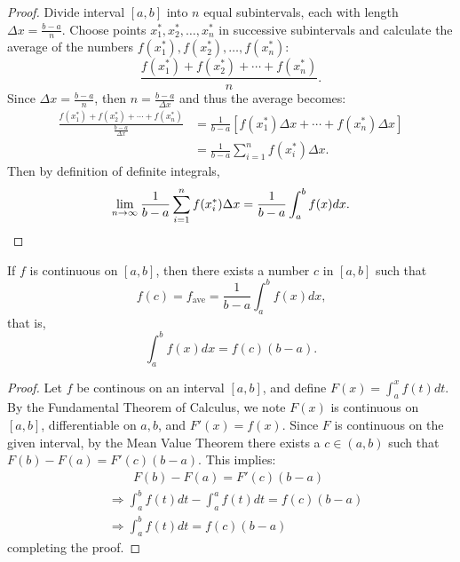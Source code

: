 \documentclass[a4paper,8pt]{article}
\begin{document}
\begin{outline}
    \begin{proof}
      Divide interval \([a, b]\) into \(n\) equal subintervals, each with length \(\Delta x = \frac{b-a}{n}\).
      Choose points \(x_1^*, x_2^*, \ldots, x_n^*\) in successive subintervals and calculate the average of the numbers
      \(f(x_1^*), f(x_2^*), \ldots, f(x_n^*)\): \[ \frac{f(x_1^*) + f(x_2^*) + \cdots + f(x_n^*)}{n}\text{.} \]
      Since \(\Delta x = \frac{b-a}{n}\), then \(n = \frac{b-a}{\Delta x}\) and thus the average becomes:
      \begin{align*}
        \frac{f(x_1^*) + f(x_2^*) + \cdots + f(x_n^*)}{\frac{b-a}{\Delta x}} &=
          \frac{1}{b-a}\left[f(x_1^*)\Delta x + \cdots + f(x_n^*)\Delta x\right] \\
          &= \frac{1}{b-a}\sum_{i=1}^n f(x_i^*)\Delta x\text{.}
      \end{align*}
      Then by definition of definite integrals,
      \[
        \lim\limits_{n\rightarrow \infty^{}}\frac{1}{b-a}\sum_{i=1}^n f(x_i^*)\Delta x = \frac{1}{b-a}\int_a^b f(x)dx\text{.}
      \]
    \end{proof}

    If \(f\) is continuous on \([a, b]\), then there exists a number \(c\) in \([a, b]\) such that
    \[ f(c) = f_{\text{ave}} = \frac{1}{b-a}\int_a^b f(x)dx\text{,} \] that is, \[ \int_a^b f(x)dx =
    f(c)(b-a)\text{.} \]

    \begin{proof}
      Let \(f\) be continous on an interval \([a, b]\), and define \(F(x) = \int_a^x f(t)dt\). By the
      Fundamental Theorem of Calculus, we note \(F(x)\) is continuous on \([a, b]\), differentiable on
      \(a, b\), and \(F'(x) = f(x)\). Since \(F\) is continuous on the given interval, by the Mean Value Theorem
      there exists a \(c \in (a, b)\) such that \(F(b) - F(a) = F'(c)(b - a)\). This implies:
      \begin{align*}
        & \qquad F(b) - F(a) = F'(c)(b - a) \\
        &\Rightarrow \int_a^b f(t)dt - \int_a^a f(t)dt = f(c)(b-a) \\
        &\Rightarrow \int_a^b f(t)dt = f(c)(b-a)
      \end{align*}
      completing the proof.
    \end{proof}

\end{outline}
\end{document}
